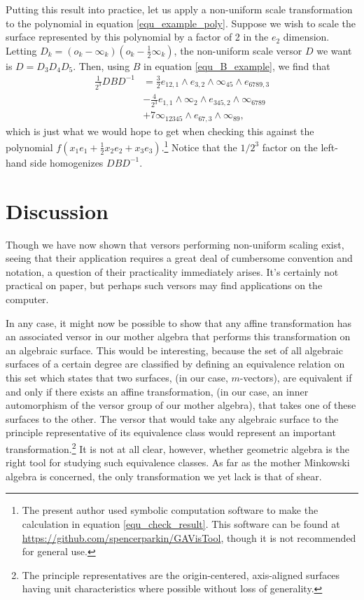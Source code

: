 \documentclass{birkjour}
\theoremstyle{definition}
\theoremstyle{remark}
\numberwithin{equation}{section}
\newcommand{\nvai}{\infty}
\newcommand{\nvao}{o}
\begin{document}
Putting this result into practice, let us apply a non-uniform scale transformation
to the polynomial in equation \eqref{equ_example_poly}.  Suppose we wish
to scale the surface represented by this polynomial by a factor of 2 in the $e_2$ dimension.
Letting $D_k=(\nvao_k-\nvai_k)\left(\nvao_k-\frac{1}{2}\nvai_k\right)$, the non-uniform
scale versor $D$ we
want is $D=D_3D_4D_5$.  Then, using $B$ in equation \eqref{equ_B_example}, we find that
\begin{align}
\frac{1}{2^3}DBD^{-1} &= \frac{3}{2}e_{12,1}\wedge e_{3,2}\wedge \nvai_{45}\wedge e_{6789,3}\nonumber \\
 &-\frac{4}{2^3}e_{1,1}\wedge\nvai_2\wedge e_{345,2}\wedge\nvai_{6789}\nonumber \\
 &+7\nvai_{12345}\wedge e_{67,3}\wedge \nvai_{89},\label{equ_check_result}
\end{align}
which is just what we would hope to get when checking this against the
polynomial $f\left(x_1e_1+\frac{1}{2}x_2e_2+x_3e_3\right)$.\footnote{The present author
used symbolic computation software to make the calculation in equation \eqref{equ_check_result}.
This software can be found at \url{https://github.com/spencerparkin/GAVisTool}, though it
is not recommended for general use.}  Notice that the $1/2^3$ factor on the left-hand
side homogenizes $DBD^{-1}$.

\section{Discussion}

Though we have now shown that versors performing non-uniform scaling
exist, seeing that their application requires a great deal of cumbersome convention and notation,
a question of their practicality immediately arises.  It's certainly not practical on paper, but
perhaps such versors may find applications on the computer.

In any case, it might now be possible to show that any affine transformation
has an associated versor in our mother algebra that performs
this transformation on an algebraic surface.  This would be interesting,
because the set of all algebraic surfaces of a certain degree are classified by defining an
equivalence relation on this set which states that two surfaces, (in our case, $m$-vectors),
are equivalent if and only if there exists an affine transformation, (in our case, an inner
automorphism of the versor group of our mother algebra), that takes one of these
surfaces to the other.  The versor that would take any algebraic surface to the
principle representative of its equivalence class would represent an important transformation.\footnote{The
principle representatives are the origin-centered, axis-aligned surfaces having unit characteristics where possible
without loss of generality.}
It is not at all clear, however,
whether geometric algebra is the right tool for studying such equivalence classes.
As far as the mother Minkowski algebra is concerned, the only transformation we yet lack
is that of shear.
\end{document}
